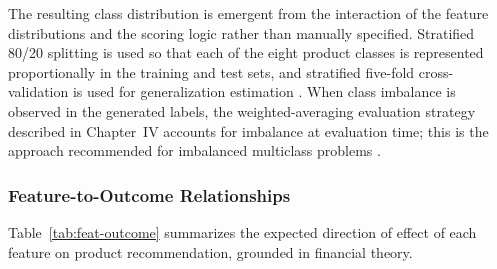 \documentclass[journal]{./IEEE/IEEEtran}
\begin{document}
The resulting class distribution is emergent from the interaction of the feature distributions and the scoring logic rather than manually specified. Stratified 80/20 splitting is used so that each of the eight product classes is represented proportionally in the training and test sets, and stratified five-fold cross-validation is used for generalization estimation \cite{ref59}. When class imbalance is observed in the generated labels, the weighted-averaging evaluation strategy described in Chapter~IV accounts for imbalance at evaluation time; this is the approach recommended for imbalanced multiclass problems \cite{ref58}.

\subsubsection{Feature-to-Outcome Relationships}

Table~\ref{tab:feat-outcome} summarizes the expected direction of effect of each feature on product recommendation, grounded in financial theory.
\end{document}
